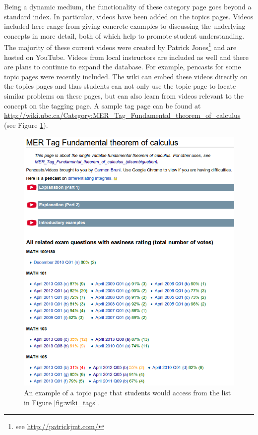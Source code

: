 \documentclass{primus}
\begin{document}
\noindent{}Being a dynamic medium, the functionality of these category page goes beyond a standard index. In particular, videos have been added on the topics pages. Videos included here range from giving concrete examples to discussing the underlying concepts in more detail, both of which help to promote student understanding. The majority of these current videos were created by Patrick Jones\footnote{see \url{http://patrickjmt.com/}} and are hosted on YouTube. Videos from local instructors are included as well and there are plans to continue to expand the database. For example, pencasts for some topic pages were recently included. The wiki can embed these videos directly on the topics pages and thus students can not only use the topic page to locate similar problems on these pages, but can also learn from videos relevant to the concept on the tagging page. A sample tag page can be found at \url{http://wiki.ubc.ca/Category:MER_Tag_Fundamental_theorem_of_calculus} (see Figure \ref{fig:topic_page}).

\begin{figure}[H]
\centering
\includegraphics[width=\textwidth]{figs/Topics_Page.png}
\caption{An example of a topic page that students would access from the list in Figure \ref{fig:wiki_tags}.}\label{fig:topic_page}
\end{figure}
\end{document}

